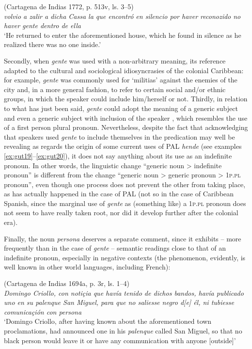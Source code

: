 \documentclass[output=paper,colorlinks,citecolor=brown]{langscibook}
\begin{document}
\ea \label{ex:gut30}
    (Cartagena de Indias 1772, p. 513v, ls. 3--5)\\
    \textit{volvio a zalir a dicha Cassa la que encontró en silencio por haver reconozido no haver gente dentro de ella}\\
    ‘He returned to enter the aforementioned house, which he found in silence as he realized there was no one inside.’
\z

Secondly, when \textit{gente} was used with a non-arbitrary meaning, its reference adapted to the cultural and sociological idiosyncrasies of the colonial Caribbean: for example, \textit{gente} was commonly used for ‘militias’ against the enemies of the city and, in a more general fashion, to refer to certain social and/or ethnic groups, in which the speaker could include him/herself or not. Thirdly, in relation to what has just been said, \textit{gente} could adopt the meaning of a generic subject and even a generic subject with inclusion of the speaker \citep[][80--82]{GutiérrezMaté2013}, which resembles the use of a first person plural pronoun. Nevertheless, despite the fact that acknowledging that speakers used \textit{gente} to include themselves in the predication may well be revealing as regards the origin of some current uses of PAL \textit{hende} (see examples \ref{ex:gut19}--\ref{ex:gut20}), it does not say anything about its use as an indefinite pronoun. In other words, the linguistic change “generic noun > indefinite pronoun” is different from the change “generic noun > generic pronoun > 1\textsc{p.pl} pronoun”, even though one process does not prevent the other from taking place, as has actually happened in the case of PAL (not so in the case of Caribbean Spanish, since the marginal use of \textit{gente} as (something like) a 1\textsc{p.pl} pronoun does not seem to have really taken root, nor did it develop further after the colonial era).

Finally, the noun \textit{persona} deserves a separate comment, since it exhibits -- more frequently than in the case of \textit{gente} -- semantic readings close to that of an indefinite pronoun, especially in negative contexts (the phenomenon, evidently, is well known in other world languages, including French):

\ea \label{ex:gut31}
    (Cartagena de Indias 1694a, p. 3r, ls. 1--4)\\
    \textit{Domingo Criollo, con notiçia que havía tenido de dichos bandos, havía publicado uno en su palenque San Miguel, para que no saliesse negro d[e] él, ni tubiesse comunicaçión con persona}\\
    ‘Domingo Criollo, after having known about the aforementioned town proclamations, had announced one in his \textit{palenque} called San Miguel, so that no black person would leave it or have any communication with anyone [outside]’
\z
\end{document}
